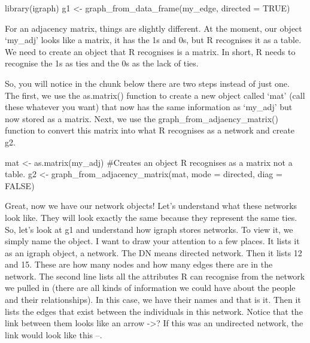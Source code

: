 \documentclass[
  letterpaper,
  DIV=11,
  numbers=noendperiod]{scrreprt}
\newenvironment{Shaded}{\begin{snugshade}}{\end{snugshade}}
\newcommand{\AttributeTok}[1]{\textcolor[rgb]{0.40,0.45,0.13}{#1}}
\newcommand{\CommentTok}[1]{\textcolor[rgb]{0.37,0.37,0.37}{#1}}
\newcommand{\ConstantTok}[1]{\textcolor[rgb]{0.56,0.35,0.01}{#1}}
\newcommand{\FunctionTok}[1]{\textcolor[rgb]{0.28,0.35,0.67}{#1}}
\newcommand{\NormalTok}[1]{\textcolor[rgb]{0.00,0.23,0.31}{#1}}
\newcommand{\OtherTok}[1]{\textcolor[rgb]{0.00,0.23,0.31}{#1}}
\newcommand{\StringTok}[1]{\textcolor[rgb]{0.13,0.47,0.30}{#1}}
\begin{document}
\begin{Shaded}
\begin{Highlighting}[]
\FunctionTok{library}\NormalTok{(igraph)}
\NormalTok{g1 }\OtherTok{\textless{}{-}} \FunctionTok{graph\_from\_data\_frame}\NormalTok{(my\_edge, }\AttributeTok{directed =} \ConstantTok{TRUE}\NormalTok{)}
\end{Highlighting}
\end{Shaded}

For an adjacency matrix, things are slightly different. At the moment,
our object `my\_adj' looks like a matrix, it has the 1s and 0s, but R
recognises it as a table. We need to create an object that R recognises
is a matrix. In short, R needs to recognise the 1s as ties and the 0s as
the lack of ties.

So, you will notice in the chunk below there are two steps instead of
just one. The first, we use the as.matrix() function to create a new
object called `mat' (call these whatever you want) that now has the same
information as `my\_adj' but now stored as a matrix. Next, we use the
graph\_from\_adjaency\_matrix() function to convert this matrix into
what R recognises as a network and create g2.

\begin{Shaded}
\begin{Highlighting}[]
\NormalTok{mat }\OtherTok{\textless{}{-}} \FunctionTok{as.matrix}\NormalTok{(my\_adj) }\CommentTok{\#Creates an object R recognises as a matrix not a table. }
\NormalTok{g2 }\OtherTok{\textless{}{-}} \FunctionTok{graph\_from\_adjacency\_matrix}\NormalTok{(mat, }\AttributeTok{mode =} \StringTok{\textquotesingle{}directed\textquotesingle{}}\NormalTok{, }\AttributeTok{diag =} \ConstantTok{FALSE}\NormalTok{)}
\end{Highlighting}
\end{Shaded}

Great, now we have our network objects! Let's understand what these
networks look like. They will look exactly the same because they
represent the same ties. So, let's look at g1 and understand how igraph
stores networks. To view it, we simply name the object. I want to draw
your attention to a few places. It lists it as an igraph object, a
network. The DN means directed network. Then it lists 12 and 15. These
are how many nodes and how many edges there are in the network. The
second line lists all the attributes R can recognise from the network we
pulled in (there are all kinds of information we could have about the
people and their relationships). In this case, we have their names and
that is it. Then it lists the edges that exist between the individuals
in this network. Notice that the link between them looks like an arrow
-\textgreater? If this was an undirected network, the link would look
like this --.
\end{document}
